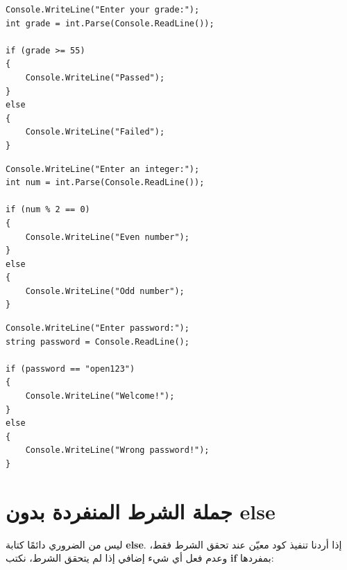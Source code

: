 \documentclass[14pt]{extarticle}
\begin{document}
\begin{boxExample}
\begin{english}
\begin{verbatim}
Console.WriteLine("Enter your grade:");
int grade = int.Parse(Console.ReadLine());

if (grade >= 55)
{
    Console.WriteLine("Passed");
}
else
{
    Console.WriteLine("Failed");
}
\end{verbatim}
\end{english}
\end{boxExample}

\begin{boxExample}
\begin{english}
\begin{verbatim}
Console.WriteLine("Enter an integer:");
int num = int.Parse(Console.ReadLine());

if (num % 2 == 0)
{
    Console.WriteLine("Even number");
}
else
{
    Console.WriteLine("Odd number");
}
\end{verbatim}
\end{english}
\end{boxExample}

\begin{boxExample}
\begin{english}
\begin{verbatim}
Console.WriteLine("Enter password:");
string password = Console.ReadLine();

if (password == "open123")
{
    Console.WriteLine("Welcome!");
}
else
{
    Console.WriteLine("Wrong password!");
}
\end{verbatim}
\end{english}
\end{boxExample}

\clearpage
\section{جملة الشرط المنفردة بدون \textenglish{else}}

ليس من الضروري دائمًا كتابة \textbf{\textenglish{else}}. إذا أردنا تنفيذ كود معيّن عند تحقق الشرط فقط، وعدم فعل أي شيء إضافي إذا لم يتحقق الشرط، نكتب \textbf{\textenglish{if}} بمفردها:
\end{document}
